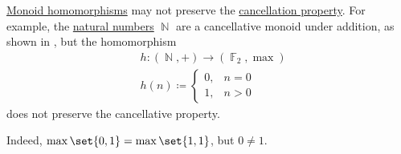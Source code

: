 \begin{example}\label{ex:monoid_cancellation_not_preserved_by_homomorphism}
  \hyperref[def:monoid/homomorphism]{Monoid homomorphisms} may not preserve the \hyperref[def:magma/cancellative]{cancellation property}. For example, the \hyperref[def:set_of_natural_numbers]{natural numbers} \( \BbbN \) are a cancellative monoid under addition, as shown in , but the homomorphism
  \begin{equation*}
    \begin{aligned}
      &h: (\BbbN, +) \to (\hyperref[thm:galois_field_existence]{\BbbF_2}, \max) \\
      &h(n) \coloneqq \begin{cases}
        0, &n = 0 \\
        1, &n > 0
      \end{cases}
    \end{aligned}
  \end{equation*}
  does not preserve the cancellative property.

  Indeed, \( \max\set{ 0, 1 } = \max\set{ 1, 1 } \), but \( 0 \neq 1 \).
\end{example}

